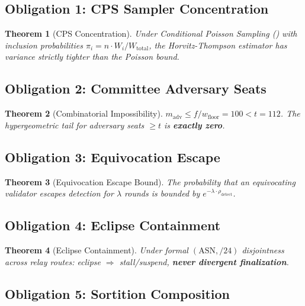 \documentclass[11pt, a4paper]{article}
\newtheorem{theorem}{Theorem}
\begin{document}
\subsection{Obligation 1: CPS Sampler Concentration}

\begin{theorem}[CPS Concentration]
\label{thm:cps}
Under Conditional Poisson Sampling () with inclusion
probabilities $\pi_i = n \cdot W_i / W_{\text{total}}$, the Horvitz-Thompson
estimator has variance strictly tighter than the Poisson bound.
\end{theorem}

\subsection{Obligation 2: Committee Adversary Seats}

\begin{theorem}[Combinatorial Impossibility]
\label{thm:committee}
 $m_{\text{adv}} \le f / w_{\text{floor}} = 100 < t = 112$.
The hypergeometric tail for adversary seats $\ge t$ is \textbf{exactly zero}.
\end{theorem}

\subsection{Obligation 3: Equivocation Escape}

\begin{theorem}[Equivocation Escape Bound]
The probability that an equivocating validator escapes detection for
 $\lambda$ rounds is bounded by $e^{-\lambda \cdot \rho_{\text{detect}}}$.
\end{theorem}

\subsection{Obligation 4: Eclipse Containment}

\begin{theorem}[Eclipse Containment]
\label{thm:eclipse}
Under formal $(\text{ASN}, /24)$ disjointness across relay routes:
eclipse $\Rightarrow$ stall/suspend, \textbf{never divergent finalization}.
\end{theorem}

\subsection{Obligation 5: Sortition Composition}
\end{document}
